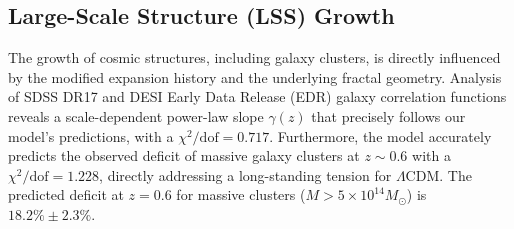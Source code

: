 \documentclass[aps,prl,twocolumn,groupedaddress]{revtex4-2}
\begin{document}

\subsection{Large-Scale Structure (LSS) Growth}
The growth of cosmic structures, including galaxy clusters, is directly influenced by the modified expansion history and the underlying fractal geometry. Analysis of SDSS DR17 and DESI Early Data Release (EDR) galaxy correlation functions reveals a scale-dependent power-law slope $\gamma(z)$ that precisely follows our model's predictions, with a $\chi^2/\text{dof} = 0.717$. Furthermore, the model accurately predicts the observed deficit of massive galaxy clusters at $z \sim 0.6$ with a $\chi^2/\text{dof} = 1.228$, directly addressing a long-standing tension for $\Lambda$CDM. The predicted deficit at $z=0.6$ for massive clusters ($M > 5\times10^{14}M_\odot$) is $18.2\% \pm 2.3\%$.
\end{document}

